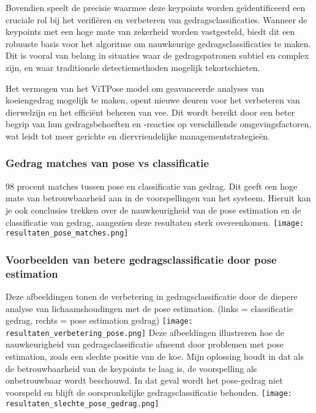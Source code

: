 Bovendien speelt de precisie waarmee deze keypoints worden geïdentificeerd een cruciale rol bij het verifiëren en verbeteren van gedragsclassificaties. Wanneer de keypoints met een hoge mate van zekerheid worden vastgesteld, biedt dit een robuuste basis voor het algoritme om nauwkeurige gedragsclassificaties te maken. Dit is vooral van belang in situaties waar de gedragspatronen subtiel en complex zijn, en waar traditionele detectiemethoden mogelijk tekortschieten.

Het vermogen van het ViTPose model om geavanceerde analyses van koeiengedrag mogelijk te maken, opent nieuwe deuren voor het verbeteren van dierwelzijn en het efficiënt beheren van vee. Dit wordt bereikt door een beter begrip van hun gedragsbehoeften en -reacties op verschillende omgevingsfactoren, wat leidt tot meer gerichte en diervriendelijke managementstrategieën.
\subsubsection{Gedrag matches van pose vs classificatie}
98 procent matches tussen pose en classificatie van gedrag. Dit geeft een hoge mate van betrouwbaarheid aan in de voorspellingen van het systeem. 
Hieruit kan je ook conclusies trekken over de nauwkeurigheid van de pose estimation en de classificatie van gedrag, aangezien deze resultaten sterk overeenkomen.
\newline
\texttt{[image: resultaten\_pose\_matches.png]}
\newline
\subsubsection{Voorbeelden van betere gedragsclassificatie door pose estimation}
Deze afbeeldingen tonen de verbetering in gedragsclassificatie door de diepere analyse van lichaamshoudingen met de pose estimation. (links = classificatie gedrag, rechts = pose estimation gedrag)
\newline
\texttt{[image: resultaten\_verbetering\_pose.png]}
\newline
Deze afbeeldingen illustreren hoe de nauwkeurigheid van gedragsclassificatie afneemt door problemen met pose estimation, zoals een slechte positie van de koe. Mijn oplossing houdt in dat als de betrouwbaarheid van de keypoints te laag is, de voorspelling als onbetrouwbaar wordt beschouwd. In dat geval wordt het pose-gedrag niet voorspeld en blijft de oorspronkelijke gedragsclassificatie behouden.
\newline
\texttt{[image: resultaten\_slechte\_pose\_gedrag.png]}
\newline
